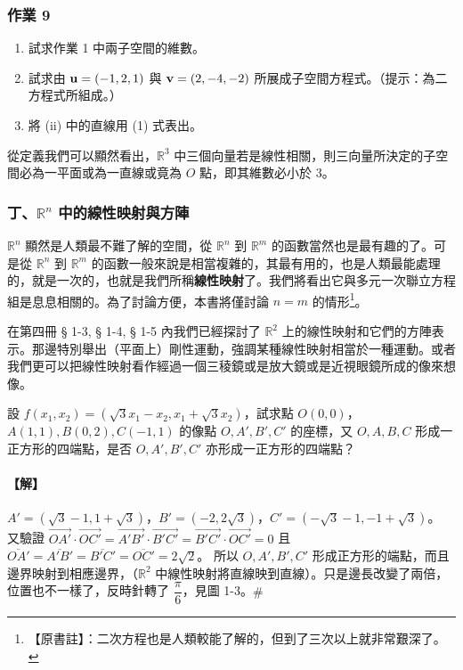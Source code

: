 \subsubsection*{作業 9}\label{hw:b6-1-9}
\begin{enumerate}[label=(\roman*), leftmargin=2em]
  \item 試求作業 1 中兩子空間的維數。
  \item 試求由 $\boldsymbol{\mathbf{u}}=(-1, 2, 1)$ 與 $\boldsymbol{\mathbf{v}}=(2, -4, -2)$ 所展成子空間方程式。（提示：為二方程式所組成。）
  \item 將 (ii) 中的直線用 (1) 式表出。
\end{enumerate}

從定義我們可以顯然看出，$\mathbb{R}^3$ 中三個向量若是線性相關，則三向量所決定的子空間必為一平面或為一直線或竟為 $O$ 點，即其維數必小於 3。

\subsubsection*{丁、$\mathbb{R}^n$ 中的線性映射與方陣}\label{subsec:b6-1-1-d}

$\mathbb{R}^n$ 顯然是人類最不難了解的空間，從 $\mathbb{R}^n$ 到 $\mathbb{R}^m$ 的函數當然也是最有趣的了。可是從 $\mathbb{R}^n$ 到 $\mathbb{R}^m$ 的函數一般來說是相當複雜的，其最有用的，也是人類最能處理的，就是一次的，也就是我們所稱\textbf{線性映射}了。我們將看出它與多元一次聯立方程組是息息相關的。為了討論方便，本書將僅討論 $n=m$ 的情形\footnote{【原書註】：二次方程也是人類較能了解的，但到了三次以上就非常艱深了。}。

在第四冊 § 1-3, § 1-4, § 1-5 內我們已經探討了 $\mathbb{R}^2$ 上的線性映射和它們的方陣表示。那邊特別舉出（平面上）剛性運動，強調某種線性映射相當於一種運動。或者我們更可以把線性映射看作經過一個三稜鏡或是放大鏡或是近視眼鏡所成的像來想像。

\begin{example}\label{ex:b6-1-7}
設 $f(x_1, x_2) = (\sqrt{3}x_1 - x_2, x_1 + \sqrt{3}x_2)$，試求點 $O(0, 0)$，$A(1, 1), B(0, 2), C(-1, 1)$ 的像點 $O, A', B', C'$ 的座標，又 $O, A, B, C$ 形成一正方形的四端點，是否 $O, A', B', C'$ 亦形成一正方形的四端點？
\end{example}

\paragraph{【解】}
$A'=(\sqrt{3}-1, 1+\sqrt{3})$，$B'=(-2, 2\sqrt{3})$，$C'=(-\sqrt{3}-1, -1+\sqrt{3})$。
又驗證 $\vec{OA'} \cdot \vec{OC'} = \vec{A'B'} \cdot \vec{B'C'} = \vec{B'C'} \cdot \vec{OC'} = 0$
且 $\overline{OA'} = \overline{A'B'} = \overline{B'C'} = \overline{OC'} = 2\sqrt{2}$。
所以 $O, A', B', C'$ 形成正方形的端點，而且邊界映射到相應邊界，（$\mathbb{R}^2$ 中線性映射將直線映到直線）。只是邊長改變了兩倍，位置也不一樣了，反時針轉了 $\dfrac{\pi}{6}$，見圖 1-3。\hfill$\#$


